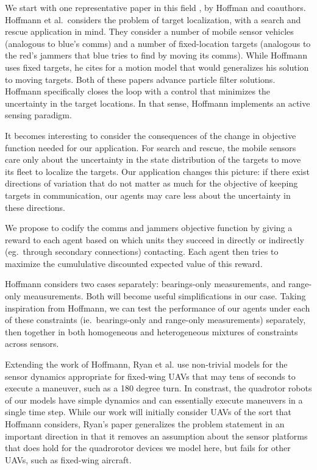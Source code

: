 \documentclass{article}
\begin{document}
We start with one representative paper in this field
\cite{hoffmann2009mobile}, by Hoffman and coauthors.  Hoffmann et al.\
considers the problem of target localization, with a search and rescue
application in mind.  They consider a number of mobile sensor vehicles
(analogous to blue's comms) and a number of fixed-location targets
(analogous to the red's jammers that blue tries to find by moving its
comms).  While Hoffmann uses fixed targets, he cites
\cite{gustafsson2002particle} for a motion model that would
generalizes his solution to moving targets.  Both of these papers
advance particle filter solutions.  Hoffmann specifically closes the
loop with a control that minimizes the uncertainty in the target
locations.  In that sense, Hoffmann implements an active sensing
paradigm.

It becomes interesting to consider the consequences of the change in
objective function needed for our application.  For search and rescue,
the mobile sensors care only about the uncertainty in the state
distribution of the targets to move its fleet to localize the targets.
Our application changes this picture: if there exist directions of
variation that do not matter as much for the objective of keeping
targets in communication, our agents may care less about the
uncertainty in these directions.

We propose to codify the comms and jammers objective function by
giving a reward to each agent based on which units they succeed in
directly or indirectly (eg.\ through secondary connections)
contacting.  Each agent then tries to maximize the cumululative
discounted expected value of this reward.

Hoffmann considers two cases separately: bearings-only measurements,
and range-only meausurements.  Both will become useful simplifications
in our case.  Taking inspiration from Hoffmann, we can test the
performance of our agents under each of these constraints (ie.\
bearings-only and range-only measurements) separately, then together
in both homogeneous and heterogeneous mixtures of constraints across
sensors.

Extending the work of Hoffmann, Ryan et al. \cite{ryan2010particle}
use non-trivial models for the sensor dynamics appropriate for
fixed-wing UAVs that may tens of seconds to execute a maneuver, such
as a 180 degree turn.  In constrast, the quadrotor robots
\cite{hoffmann2007quadrotor} of our models have simple dynamics and
can essentially execute maneuvers in a single time step.  While our
work will initially consider UAVs of the sort that Hoffmann considers,
Ryan's paper generalizes the problem statement in an important
direction in that it removes an assumption about the sensor platforms
that does hold for the quadrorotor devices we model here, but fails
for other UAVs, such as fixed-wing aircraft.
\end{document}
